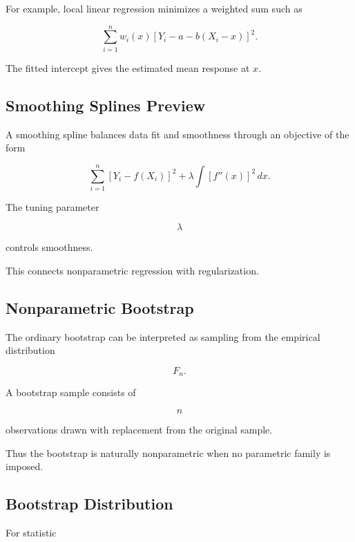 For example, local linear regression minimizes a weighted sum such as

\[
\boxed{
\sum_{i=1}^{n}
w_i(x)
[
Y_i-a-b(X_i-x)
]^2.
}
\]

The fitted intercept gives the estimated mean response at \(x\).

\subsection{Smoothing Splines Preview}
\label{subsec:smoothing-splines-preview}

A smoothing spline balances data fit and smoothness through an objective
of the form

\[
\boxed{
\sum_{i=1}^{n}
[
Y_i-f(X_i)
]^2
+
\lambda
\int
[f''(x)]^2\,dx.
}
\]

The tuning parameter

\[
\lambda
\]

controls smoothness.

This connects nonparametric regression with regularization.

\subsection{Nonparametric Bootstrap}
\label{subsec:nonparametric-bootstrap}

The ordinary bootstrap can be interpreted as sampling from the empirical
distribution

\[
F_n.
\]

A bootstrap sample consists of

\[
n
\]

observations drawn with replacement from the original sample.

Thus the bootstrap is naturally nonparametric when no parametric family
is imposed.

\subsection{Bootstrap Distribution}
\label{subsec:bootstrap-distribution-nonparametric}

For statistic

